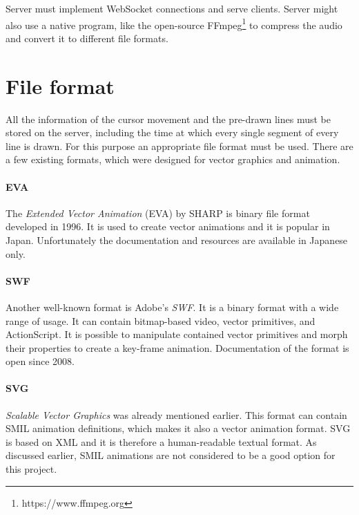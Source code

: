 Server must implement WebSocket connections and serve clients. Server might also use a native program, like the open-source FFmpeg\footnote{https://www.ffmpeg.org} to compress the audio and convert it to different file formats.









\section{File format}
All the information of the cursor movement and the pre-drawn lines must be stored on the server, including the time at which every single segment of every line is drawn. For this purpose an appropriate file format must be used. There are a few existing formats, which were designed for vector graphics and animation.

\paragraph{EVA} The \textit{Extended Vector Animation} (EVA)  by SHARP\cite{eva_sharp} is binary file format developed in 1996. It is used to create vector animations and it is popular in Japan. Unfortunately the documentation and resources are available in Japanese only\cite{eva_wikipedia}.

\paragraph{SWF} Another well-known format is Adobe's \textit{SWF}. It is a binary format with a wide range of usage. It can contain bitmap-based video, vector primitives, and ActionScript\cite{swf_wiki}. It is possible to manipulate contained vector primitives and morph their properties to create a key-frame animation\cite{swf_doc}. Documentation of the format is open since 2008.

\paragraph{SVG} \textit{Scalable Vector Graphics} was already mentioned earlier. This format can contain SMIL animation definitions, which makes it also a vector animation format. SVG is based on XML and it is therefore a human-readable textual format. As discussed earlier, SMIL animations are not considered to be a good option for this project.

